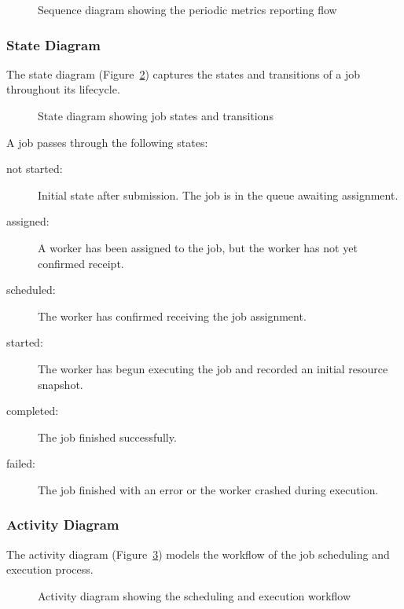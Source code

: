 \begin{figure}[htbp]
	\centering
	\caption{Sequence diagram showing the periodic metrics reporting flow}
	\label{fig:sequence-metrics-reporting}
\end{figure}

\subsubsection{State Diagram}

The state diagram (Figure~\ref{fig:state-job-states}) captures the states and transitions of a job throughout its lifecycle.

\begin{figure}[htbp]
	\centering
	\caption{State diagram showing job states and transitions}
	\label{fig:state-job-states}
\end{figure}

A job passes through the following states:
\begin{description}
	\item[not started:] Initial state after submission. The job is in the queue awaiting assignment.
	\item[assigned:] A worker has been assigned to the job, but the worker has not yet confirmed receipt.
	\item[scheduled:] The worker has confirmed receiving the job assignment.
	\item[started:] The worker has begun executing the job and recorded an initial resource snapshot.
	\item[completed:] The job finished successfully.
	\item[failed:] The job finished with an error or the worker crashed during execution.
\end{description}

\subsubsection{Activity Diagram}

The activity diagram (Figure~\ref{fig:activity-workflow}) models the workflow of the job scheduling and execution process.

\begin{figure}[htbp]
	\centering
	\caption{Activity diagram showing the scheduling and execution workflow}
	\label{fig:activity-workflow}
\end{figure}

